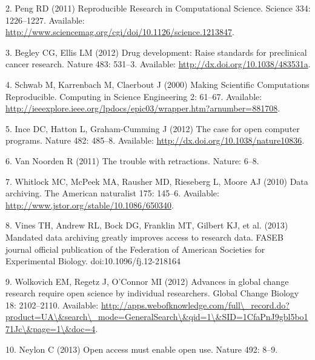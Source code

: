 \documentclass[]{article}
\begin{document}
2. Peng RD (2011) Reproducible Research in Computational Science.
Science 334: 1226--1227. Available:
\href{http://www.sciencemag.org/cgi/doi/10.1126/science.1213847}{http://www.sciencemag.org/cgi/doi/10.1126/science.1213847}.

3. Begley CG, Ellis LM (2012) Drug development: Raise standards for
preclinical cancer research. Nature 483: 531--3. Available:
\href{http://dx.doi.org/10.1038/483531a}{http://dx.doi.org/10.1038/483531a}.

4. Schwab M, Karrenbach M, Claerbout J (2000) Making Scientific
Computations Reproducible. Computing in Science Engineering 2: 61--67.
Available:
\href{http://ieeexplore.ieee.org/lpdocs/epic03/wrapper.htm?arnumber=881708}{http://ieeexplore.ieee.org/lpdocs/epic03/wrapper.htm?arnumber=881708}.

5. Ince DC, Hatton L, Graham-Cumming J (2012) The case for open computer
programs. Nature 482: 485--8. Available:
\href{http://dx.doi.org/10.1038/nature10836}{http://dx.doi.org/10.1038/nature10836}.

6. Van Noorden R (2011) The trouble with retractions. Nature: 6--8.

7. Whitlock MC, McPeek MA, Rausher MD, Rieseberg L, Moore AJ (2010) Data
archiving. The American naturalist 175: 145--6. Available:
\href{http://www.jstor.org/stable/10.1086/650340}{http://www.jstor.org/stable/10.1086/650340}.

8. Vines TH, Andrew RL, Bock DG, Franklin MT, Gilbert KJ, et al. (2013)
Mandated data archiving greatly improves access to research data. FASEB
journal official publication of the Federation of American Societies for
Experimental Biology. doi:10.1096/fj.12-218164

9. Wolkovich EM, Regetz J, O'Connor MI (2012) Advances in global change
research require open science by individual researchers. Global Change
Biology 18: 2102--2110. Available:
\href{http://apps.webofknowledge.com/full\textbackslash{}\_record.do?product=UA\textbackslash{}\&search\textbackslash{}\_mode=GeneralSearch\textbackslash{}\&qid=1\textbackslash{}\&SID=1CfaPnJ9gbl5bo171Jc\textbackslash{}\&page=1\textbackslash{}\&doc=4}{http://apps.webofknowledge.com/full\textbackslash{}\_record.do?product=UA\textbackslash{}\&search\textbackslash{}\_mode=GeneralSearch\textbackslash{}\&qid=1\textbackslash{}\&SID=1CfaPnJ9gbl5bo171Jc\textbackslash{}\&page=1\textbackslash{}\&doc=4}.

10. Neylon C (2013) Open access must enable open use. Nature 492: 8--9.
\end{document}
